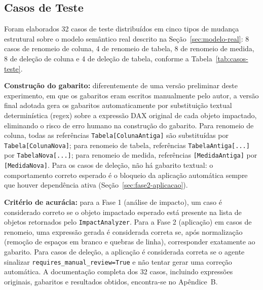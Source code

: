 \documentclass[
    12pt,               %
    openright,          %
    oneside,            %
    a4paper,            %
    chapter=TITLE,      %
    section=TITLE,      %
    brazil              %
]{abntex2}
\begin{document}
\subsection{Casos de Teste}

Foram elaborados 32 casos de teste distribuídos em cinco tipos de mudança estrutural sobre o modelo semântico real descrito na Seção~\ref{sec:modelo-real}: 8 casos de renomeio de coluna, 4 de renomeio de tabela, 8 de renomeio de medida, 8 de deleção de coluna e 4 de deleção de tabela, conforme a Tabela~\ref{tab:casos-teste}.

\textbf{Construção do gabarito:} diferentemente de uma versão preliminar deste experimento, em que os gabaritos eram escritos manualmente pelo autor, a versão final adotada gera os gabaritos automaticamente por substituição textual determinística (regex) sobre a expressão DAX original de cada objeto impactado, eliminando o risco de erro humano na construção do gabarito. Para renomeio de coluna, todas as referências \texttt{Tabela[ColunaAntiga]} são substituídas por \texttt{Tabela[ColunaNova]}; para renomeio de tabela, referências \texttt{TabelaAntiga[...]} por \texttt{TabelaNova[...]}; para renomeio de medida, referências \texttt{[MedidaAntiga]} por \texttt{[MedidaNova]}. Para os casos de deleção, não há gabarito textual: o comportamento correto esperado é o bloqueio da aplicação automática sempre que houver dependência ativa (Seção~\ref{sec:fase2-aplicacao}).

\textbf{Critério de acurácia:} para a Fase 1 (análise de impacto), um caso é considerado correto se o objeto impactado esperado está presente na lista de objetos retornados pelo \texttt{ImpactAnalyzer}. Para a Fase 2 (aplicação) em casos de renomeio, uma expressão gerada é considerada correta se, após normalização (remoção de espaços em branco e quebras de linha), corresponder exatamente ao gabarito. Para casos de deleção, a aplicação é considerada correta se o agente sinalizar \texttt{requires\_manual\_review=True} e não tentar gerar uma correção automática. A documentação completa dos 32 casos, incluindo expressões originais, gabaritos e resultados obtidos, encontra-se no Apêndice~B.
\end{document}
